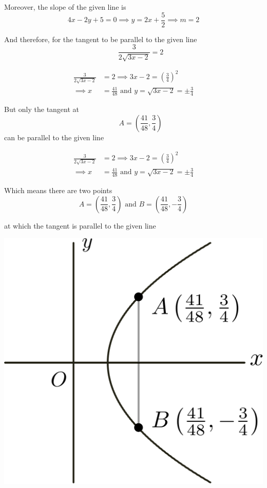 \documentclass[14pt,fleqn]{extarticle}
\begin{document}
Moreover, the slope of the given line is 
\[ 4x-2y + 5 = 0 \implies y = 2x + \frac{5}{2} \implies m = 2 \]

And therefore, for the tangent to be parallel to the given line
\[ \qquad \frac{3}{2\sqrt{3x-2}} = 2 \]

\newcard 

\begin{align}
	\frac{3}{2\sqrt{3x-2}} &= 2 \implies 3x - 2 = \left(\frac{3}{4} \right)^2  \\
	\implies x &= \frac{41}{48} \text{ and } y = \sqrt{3x-2} = \pm \frac{3}{4} 
\end{align}

But only the tangent at  
\[ \qquad A = \left(\frac{41}{48}, \frac{3}{4} \right)\]
can be parallel to the given line 

\newcard 

\begin{align}
	\frac{3}{2\sqrt{3x-2}} &= 2 \implies 3x - 2 = \left(\frac{3}{4} \right)^2  \\
	\implies x &= \frac{41}{48} \text{ and } y = \sqrt{3x-2} = \pm \frac{3}{4} 
\end{align}

Which means there are two points 
\[ A = \left(\frac{41}{48}, \frac{3}{4} \right) \text{ and } B = \left(\frac{41}{48}, -\frac{3}{4} \right)\]

at which the tangent is parallel to the given line 

\newcard 

\begin{center}
\includegraphics[scale=0.3]{rs-2.svg} 
\end{center} 
\end{document}
